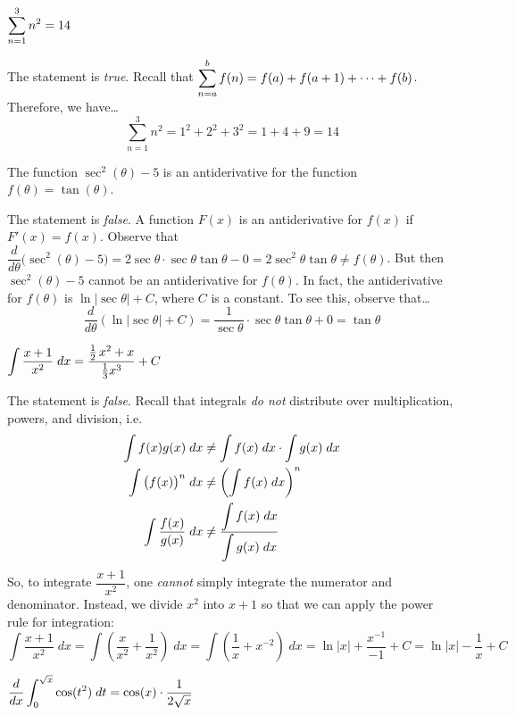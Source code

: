 \documentclass[11pt,letterpaper]{article}
\begin{document}
 $\displaystyle\sum_{n=1}^3 n^2= 14$ \pspace

\sol The statement is \textit{true}. Recall that $\displaystyle\sum_{n=a}^b f(n)= f(a) + f(a + 1) + \cdots + f(b)$. Therefore, we have\dots
	\[
	\sum_{n=1}^3 n^2= 1^2 + 2^2 + 3^2= 1 + 4 + 9= 14
	\] \pvspace{1.3cm}



 The function $\sec^2(\theta) - 5$ is an antiderivative for the function $f(\theta)= \tan(\theta)$. \pspace

\sol The statement is \textit{false}. A function $F(x)$ is an antiderivative for $f(x)$ if $F'(x)= f(x)$. Observe that $\dfrac{d}{d\theta} \big( \sec^2(\theta) - 5 \big)= 2 \sec \theta \cdot \sec \theta \tan \theta - 0= 2 \sec^2 \theta \tan \theta \neq f(\theta)$. But then $\sec^2(\theta) - 5$ cannot be an antiderivative for $f(\theta)$. In fact, the antiderivative for $f(\theta)$ is $\ln|\sec \theta| + C$, where $C$ is a constant. To see this, observe that\dots
	\[
	\dfrac{d}{d\theta} \left( \ln|\sec \theta| + C \right)= \dfrac{1}{\sec \theta} \cdot \sec \theta \tan \theta + 0= \tan \theta
	\] \pvspace{1.3cm}



 $\displaystyle\int \dfrac{x + 1}{x^2} \;dx= \dfrac{\frac{1}{2}\,x^2 + x}{\frac{1}{3} x^3} + C$ \pspace

\sol The statement is \textit{false}. Recall that integrals \textit{do not} distribute over multiplication, powers, and division, i.e.
	\[
	\begin{aligned}
	\int f(x) g(x) \;dx &\neq \int f(x) \;dx \cdot \int g(x) \;dx \\
	\int \big( f(x) \big)^n \;dx &\neq \left( \int f(x) \;dx \right)^n \\
	\int \dfrac{f(x)}{g(x)} \;dx &\neq \dfrac{\displaystyle\int f(x) \;dx}{\displaystyle\int g(x) \;dx}
	\end{aligned}
	\]
So, to integrate $\dfrac{x + 1}{x^2}$, one \textit{cannot} simply integrate the numerator and denominator. Instead, we divide $x^2$ into $x + 1$ so that we can apply the power rule for integration:
	\[
	\int \dfrac{x + 1}{x^2} \;dx= \int \left( \dfrac{x}{x^2} + \dfrac{1}{x^2} \right) \;dx= \int \left( \dfrac{1}{x} + x^{-2} \right) \;dx= \ln|x| + \dfrac{x^{-1}}{-1} + C= \ln|x| - \dfrac{1}{x} + C
	\] \pvspace{1.3cm}



 $\displaystyle\dfrac{d}{dx} \int_0^{\sqrt{x}} \cos(t^2) \;dt= \cos(x) \cdot \dfrac{1}{2\sqrt{x}}$ \pspace
\end{document}
